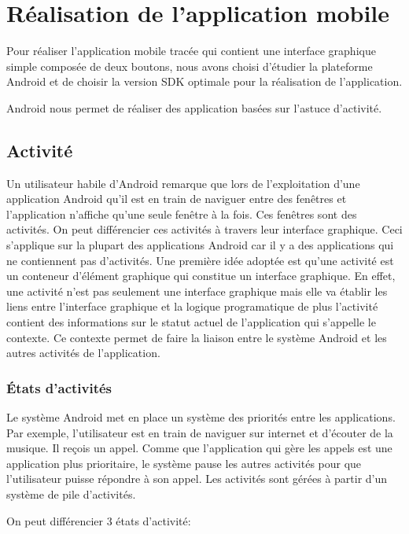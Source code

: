 \section{Réalisation de l'application mobile}

Pour réaliser l'application mobile tracée qui contient une interface graphique
simple composée de deux boutons, nous avons choisi d'étudier la plateforme
Android et de choisir la version SDK optimale pour la réalisation de
l'application.

Android nous permet de réaliser des application basées sur l'astuce d'activité.

\subsection{Activité}

Un utilisateur habile d'Android remarque que lors de l'exploitation d'une
application Android qu'il est en train de naviguer entre des fenêtres et
l'application n'affiche qu'une seule fenêtre à la fois. Ces fenêtres sont des
activités. On peut différencier ces activités à travers leur interface
graphique. Ceci s'applique sur la plupart des applications Android car il y a
des applications qui ne contiennent pas d'activités. Une première idée adoptée
est qu'une activité est un conteneur d'élément graphique qui constitue un
interface graphique. En effet, une activité n'est pas seulement une interface
graphique mais elle va établir les liens entre l'interface graphique et la
logique programatique de plus l'activité contient des informations sur le
statut actuel de l'application qui s'appelle le contexte. Ce contexte permet de
faire la liaison entre le système Android et les autres activités de
l'application.

\subsubsection{États d'activités}

Le système Android met en place un système des priorités entre les
applications.  Par exemple, l'utilisateur est en train de naviguer sur internet
et d'écouter de la musique. Il reçois un appel. Comme que l'application qui
gère les appels est une application plus prioritaire, le système pause les
autres activités pour que l'utilisateur puisse répondre à son appel. Les
activités sont gérées à partir d'un système de pile d'activités.

On peut différencier 3 états d'activité:

